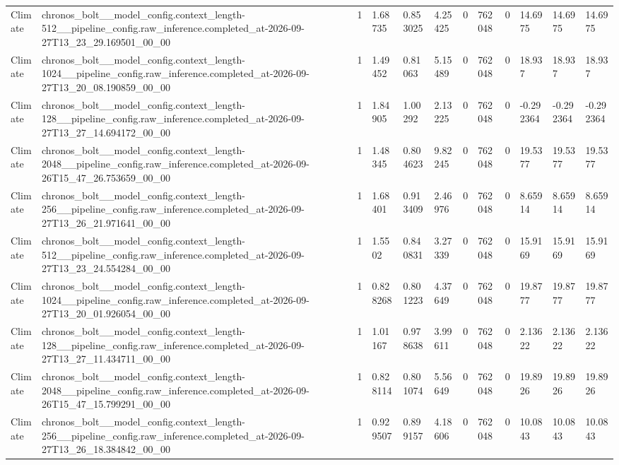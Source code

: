 \begin{tabular}{llllllllllll}
Climate & chronos\_bolt\_\_model\_config.context\_length-512\_\_pipeline\_config.raw\_inference.completed\_at-2026-09-27T13\_23\_29.169501\_00\_00 & 1 & 1.68735 & 0.853025 & 4.25425 & 0 & 762048 & 0 & 14.6975 & 14.6975 & 14.6975 \\
Climate & chronos\_bolt\_\_model\_config.context\_length-1024\_\_pipeline\_config.raw\_inference.completed\_at-2026-09-27T13\_20\_08.190859\_00\_00 & 1 & 1.49452 & 0.81063 & 5.15489 & 0 & 762048 & 0 & 18.937 & 18.937 & 18.937 \\
Climate & chronos\_bolt\_\_model\_config.context\_length-128\_\_pipeline\_config.raw\_inference.completed\_at-2026-09-27T13\_27\_14.694172\_00\_00 & 1 & 1.84905 & 1.00292 & 2.13225 & 0 & 762048 & 0 & -0.292364 & -0.292364 & -0.292364 \\
Climate & chronos\_bolt\_\_model\_config.context\_length-2048\_\_pipeline\_config.raw\_inference.completed\_at-2026-09-26T15\_47\_26.753659\_00\_00 & 1 & 1.48345 & 0.804623 & 9.82245 & 0 & 762048 & 0 & 19.5377 & 19.5377 & 19.5377 \\
Climate & chronos\_bolt\_\_model\_config.context\_length-256\_\_pipeline\_config.raw\_inference.completed\_at-2026-09-27T13\_26\_21.971641\_00\_00 & 1 & 1.68401 & 0.913409 & 2.46976 & 0 & 762048 & 0 & 8.65914 & 8.65914 & 8.65914 \\
Climate & chronos\_bolt\_\_model\_config.context\_length-512\_\_pipeline\_config.raw\_inference.completed\_at-2026-09-27T13\_23\_24.554284\_00\_00 & 1 & 1.5502 & 0.840831 & 3.27339 & 0 & 762048 & 0 & 15.9169 & 15.9169 & 15.9169 \\
Climate & chronos\_bolt\_\_model\_config.context\_length-1024\_\_pipeline\_config.raw\_inference.completed\_at-2026-09-27T13\_20\_01.926054\_00\_00 & 1 & 0.828268 & 0.801223 & 4.37649 & 0 & 762048 & 0 & 19.8777 & 19.8777 & 19.8777 \\
Climate & chronos\_bolt\_\_model\_config.context\_length-128\_\_pipeline\_config.raw\_inference.completed\_at-2026-09-27T13\_27\_11.434711\_00\_00 & 1 & 1.01167 & 0.978638 & 3.99611 & 0 & 762048 & 0 & 2.13622 & 2.13622 & 2.13622 \\
Climate & chronos\_bolt\_\_model\_config.context\_length-2048\_\_pipeline\_config.raw\_inference.completed\_at-2026-09-26T15\_47\_15.799291\_00\_00 & 1 & 0.828114 & 0.801074 & 5.56649 & 0 & 762048 & 0 & 19.8926 & 19.8926 & 19.8926 \\
Climate & chronos\_bolt\_\_model\_config.context\_length-256\_\_pipeline\_config.raw\_inference.completed\_at-2026-09-27T13\_26\_18.384842\_00\_00 & 1 & 0.929507 & 0.899157 & 4.18606 & 0 & 762048 & 0 & 10.0843 & 10.0843 & 10.0843 \\

\end{tabular}
